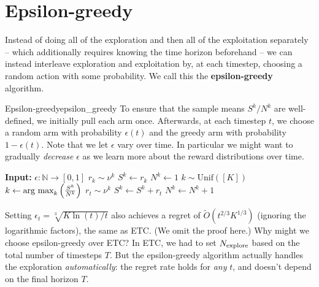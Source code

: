 \documentclass[\main/main]{subfiles}
\begin{document}
\section{Epsilon-greedy}

Instead of doing all of the exploration and then all of the exploitation separately -- which additionally requires knowing the time horizon beforehand -- we can instead interleave exploration and exploitation by, at each timestep, choosing a random action with some probability. We call this the \textbf{epsilon-greedy} algorithm.

\begin{definition}{Epsilon-greedy}{epsilon_greedy}
    To ensure that the sample means $S^k/N^k$ are well-defined, we initially pull each arm once. Afterwards, at each timestep $t$, we choose a random arm with probability $\epsilon(t)$ and the greedy arm with probability $1-\epsilon(t)$.
    Note that we let $\epsilon$ vary over time. In particular we might want to gradually \emph{decrease} $\epsilon$ as we learn more about the reward distributions over time.

    \begin{algorithmic}
        \State \textbf{Input:} $\epsilon : \mathbb{N} \to [0, 1]$
        \State $r_k \sim \nu^k$
        \State $S^k \gets r_k$
        \State $N^k \gets 1$
        \EndFor
        \State $k \sim \text{Unif}([K])$
        \Else
        \State $k \gets \operatorname*{\textrm{arg\ max}}_k \left(\frac{S^k}{N^k}\right)$
        \EndIf
        \State $r_t \sim \nu^k$
        \State $S^k \gets S^k + r_t$
        \State $N^k \gets N^k + 1$
        \EndFor
    \end{algorithmic}
\end{definition}


Setting $\epsilon_t = \sqrt[3]{K \ln(t)/t}$ also achieves a regret of $\tilde O(t^{2/3} K^{1/3})$ (ignoring the logarithmic factors), the same as ETC. (We omit the proof here.)
Why might we choose epsilon-greedy over ETC?
In ETC, we had to set $N_{\text{explore}}$ based on the total number of timesteps $T$. But the epsilon-greedy algorithm actually handles the exploration \emph{automatically}: the regret rate holds for \emph{any} $t$, and doesn't depend on the final horizon $T$.

\end{document}
